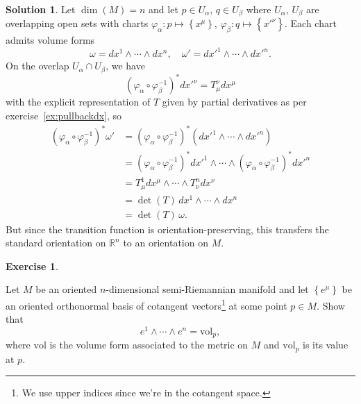 \documentclass[11pt, a4paper]{report}
\theoremstyle{definition}
\newtheorem{ex}{Exercise}[part]
\newtheorem{sol}{Solution}[part]
\begin{document}
\begin{sol}

Let $\dim(M) = n$ and let $p \in U_\alpha$, $q \in U_\beta$ where $U_\alpha$, $U_\beta$ are overlapping open sets with charts $\varphi_\alpha: p \mapsto \left\{x^\mu\right\}$, $\varphi_\beta: q \mapsto \left\{x'^\nu\right\}$. Each chart admits volume forms
\[
    \omega = dx^1 \wedge \cdots \wedge dx^n, \quad
    \omega' = dx'^1 \wedge \cdots \wedge dx'^n.
\]
On the overlap $U_\alpha \cap U_\beta$, we have
\[
{(\varphi_\alpha \circ \varphi_\beta^{-1})}^* dx'^\nu = T_\mu^\nu dx^\mu
\]
with the explicit representation of $T$ given by partial derivatives as per exercise~\ref{ex:pullbackdx}, so
\begin{align*}
    {(\varphi_\alpha \circ \varphi_\beta^{-1})}^* \omega' &= {(\varphi_\alpha \circ \varphi_\beta^{-1})}^* (dx'^1 \wedge \cdots \wedge dx'^n) \\
        &= {(\varphi_\alpha \circ \varphi_\beta^{-1})}^* dx'^1 \wedge \cdots \wedge {(\varphi_\alpha \circ \varphi_\beta^{-1})}^* dx'^n \\
        &= T_\mu^1 dx^\mu \wedge \cdots \wedge T_\nu^n dx^\nu \\
        &= \det(T) \, dx^1 \wedge \cdots \wedge dx^n \\
        &= \det(T) \, \omega.
\end{align*}
But since the transition function is orientation-preserving, this transfers the standard orientation on $\mathbb{R}^n$ to an orientation on $M$.

\end{sol}

\begin{ex}\label{ex:canonicalvolumeform}

Let $M$ be an oriented $n$-dimensional semi-Riemannian manifold and let $\left\{e^\mu\right\}$ be an oriented orthonormal basis of cotangent vectors\footnote{We use upper indices since we're in the cotangent space.} at some point $p \in M$. Show that
\[
    e^1 \wedge \cdots \wedge e^n = \text{vol}_p,
\]
where $\text{vol}$ is the volume form associated to the metric on $M$ and $\text{vol}_p$ is its value at $p$.

\end{ex}
\end{document}
